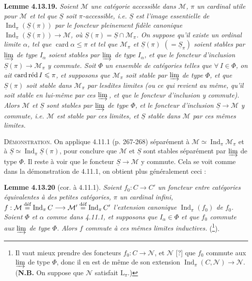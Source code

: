 \documentclass[11pt]{article}
\newcommand{\msp}[1]{\marginpar{\footnotesize [#1]}}
\newcommand{\card}{\operatorname{card}}
\DeclareMathOperator{\Ind}{Ind}
\newcommand{\cardred}{\mathop{\textup{card\,réd}}\nolimits}
\begin{document}
\textbf{Lemme 4.13.19.} \textit{Soient $\mathcal{M}$ une catégorie accessible dans $\mathcal{M}$, $\pi$ un cardinal utile pour $\mathcal{M}$ et tel que $\underline{S}$ soit $\pi$-accessible, i.e. $\underline{S}$ est l'image essentielle de $\Ind_\pi(\underline{S}(\pi))$ par le foncteur pleinement fidèle canonique $\Ind_\pi(\underline{S}(\pi))\longrightarrow\mathcal{M}$, où $\underline{S}(\pi)=\underline{S}\cap\mathcal{M}_\pi$. On suppose qu'il existe un ordinal limite $\alpha$, tel que $\card\alpha\leqslant\pi$ et tel que $\mathcal{M}_\pi$ et $\underline{S}(\pi)$ $(=\underline{S}_\pi)$ soient stables par $\varinjlim$ de type $I_\alpha$ soient stables par $\varinjlim$ de type $I_\alpha$, et que le foncteur d'inclusion $\underline{S}(\pi)\longrightarrow\mathcal{M}_\pi$ y commute. Soit $\Phi$ un ensemble de catégories telles que $\forall\ I\in\Phi$, on ait $\cardred I\leqslant\pi$, et supposons que $\mathcal{M}_\pi$ soit stable par $\varinjlim$ de type $\Phi$, et que $\underline{S}(\pi)$ soit stable dans $\mathcal{M}_\pi$ par lesdites limites (ou ce qui revient au même, qu'il soit stable en lui-même par ces $\varinjlim$\,, et que le foncteur d'inclusion y commute). Alors $\mathcal{M}$ et $\underline{S}$ sont stables par $\varinjlim$ de type $\Phi$, et le foncteur d'inclusion $\underline{S}\longrightarrow\mathcal{M}$ y commute, i.e. $\mathcal{M}$ est stable par ces limites, et $\underline{S}$ stable dans $\mathcal{M}$ par ces mêmes limites.} %

\msp{page 341}
\textsc{Démonstration}. On applique 4.11.1 (p. 267-268) séparément à $\mathcal{M}\simeq\Ind_\pi\mathcal{M}_\pi$ et à $\underline{S}\simeq\Ind_\pi\underline{S}(\pi)$, pour conclure que $\mathcal{M}$ et $\underline{S}$ sont stables séparément par $\varinjlim$ de type $\Phi$. Il reste à voir que le foncteur $\underline{S}\longrightarrow\mathcal{M}$ y commute. Cela se voit comme dans la démonstration de 4.11.1, on obtient plus généralement ceci :

\textbf{Lemme 4.13.20} (cor. à 4.11.1). \textit{Soient $f_0 : C\longrightarrow C'$ un foncteur entre catégories équivalentes à des petites catégories, $\pi$ un cardinal infini, $f:\mathcal{M}\stackrel{\textup{déf}}{=}\Ind_\pi C\longrightarrow\mathcal{M}'\stackrel{\textup{déf}}{=}\Ind_\pi C'$ l'extension canonique $\Ind_\pi(f_0)$ de $f_0$. Soient $\Phi$ et $\alpha$ comme dans 4.11.1, et supposons que $I_\alpha\in\Phi$ et que $f_0$ commute aux $\varinjlim$ de type $\Phi$. Alors $f$ commute à ces mêmes limites inductives.} (\footnote{Il vaut mieux prendre des foncteurs $f_0 : C\longrightarrow\mathcal{N}$, et $\mathcal{N}$ [?] que $f_0$ commute aux $\varinjlim$ de type $\Phi$, donc il en est de même de son extension $\Ind_\pi(C,\mathcal{N})\longrightarrow\mathcal{N}$. (\textbf{N.B.} On suppose que $\mathcal{N}$ satisfait $\mathrm{L}_\pi$.)}).
\end{document}
